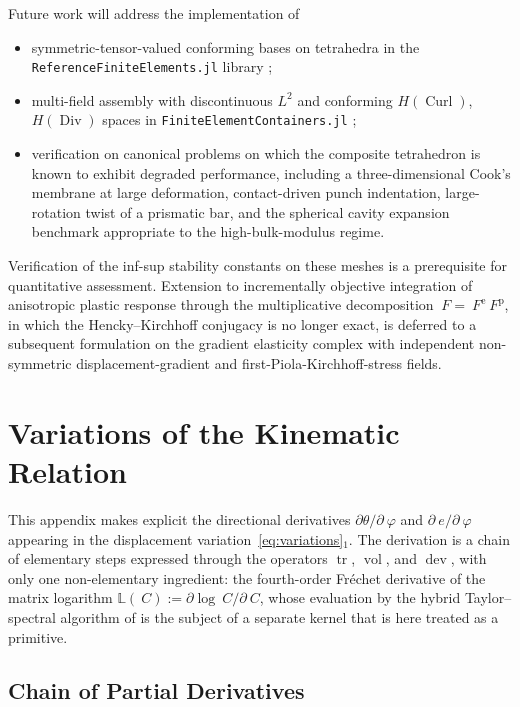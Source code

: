 \documentclass[12pt]{article}
\newcommand{\F}{~F}
\newcommand{\C}{~C}
\newcommand{\edev}{~e}
\DeclareMathOperator{\trace}{tr}
\DeclareMathOperator{\dev}{dev}
\DeclareMathOperator{\vol}{vol}
\DeclareMathOperator{\Div}{Div}
\DeclareMathOperator{\Curl}{Curl}
\begin{document}
Future work will address the implementation of
\begin{itemize}
  \item symmetric-tensor-valued conforming bases on tetrahedra in the
    \texttt{ReferenceFiniteElements.jl} library
    \citep{Cthonios:RFE};
  \item multi-field assembly with discontinuous $L^2$ and conforming
    $H(\Curl)$, $H(\Div)$ spaces in
    \texttt{FiniteElementContainers.jl} \citep{Cthonios:FEC};
  \item verification on canonical problems on which the composite
    tetrahedron is known to exhibit degraded performance, including
    a three-dimensional Cook's membrane at large deformation,
    contact-driven punch indentation, large-rotation twist of a
    prismatic bar, and the spherical cavity expansion benchmark
    appropriate to the high-bulk-modulus regime.
\end{itemize}
Verification of the inf-sup stability constants on these meshes is
a prerequisite for quantitative assessment. Extension to
incrementally objective integration of anisotropic plastic response
through the multiplicative decomposition $\F = \F^{\mathrm{e}} \F^{\mathrm{p}}$,
in which the Hencky--Kirchhoff conjugacy is no longer exact, is
deferred to a subsequent formulation on the gradient elasticity
complex with independent non-symmetric displacement-gradient and
first-Piola-Kirchhoff-stress fields.


\appendix

\section{Variations of the Kinematic Relation}
\label{app:variations}

This appendix makes explicit the directional derivatives
$\partial \theta / \partial ~\varphi$ and
$\partial \edev / \partial ~\varphi$ appearing in the displacement
variation~\eqref{eq:variations}$_1$. The derivation is a chain of
elementary steps expressed through the operators $\trace$, $\vol$,
and $\dev$, with only one non-elementary ingredient: the
fourth-order Fr\'echet derivative of the matrix logarithm
$\mathbb{L}(\C) := \partial \log \C / \partial \C$, whose evaluation
by the hybrid Taylor--spectral algorithm of
\citet{Ortiz.Radovitzky.Repetto:2001} is the subject of a separate
kernel that is here treated as a primitive.

\subsection{Chain of Partial Derivatives}
\label{app:chain}
\end{document}
